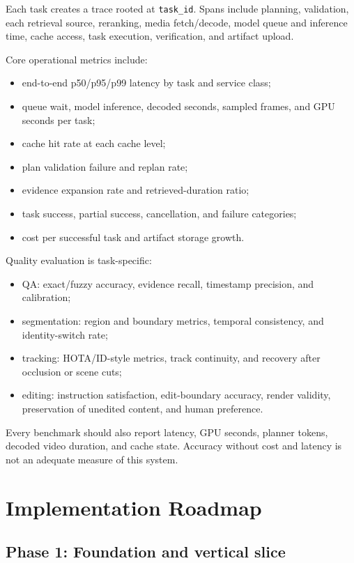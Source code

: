 \documentclass[11pt]{article}
\newcommand{\code}[1]{\texttt{#1}}
\begin{document}
Each task creates a trace rooted at \code{task\_id}. Spans include planning,
validation, each retrieval source, reranking, media fetch/decode, model queue and
inference time, cache access, task execution, verification, and artifact upload.

Core operational metrics include:

\begin{itemize}
  \item end-to-end p50/p95/p99 latency by task and service class;
  \item queue wait, model inference, decoded seconds, sampled frames, and GPU
  seconds per task;
  \item cache hit rate at each cache level;
  \item plan validation failure and replan rate;
  \item evidence expansion rate and retrieved-duration ratio;
  \item task success, partial success, cancellation, and failure categories;
  \item cost per successful task and artifact storage growth.
\end{itemize}

Quality evaluation is task-specific:

\begin{itemize}
  \item QA: exact/fuzzy accuracy, evidence recall, timestamp precision, and
  calibration;
  \item segmentation: region and boundary metrics, temporal consistency, and
  identity-switch rate;
  \item tracking: HOTA/ID-style metrics, track continuity, and recovery after
  occlusion or scene cuts;
  \item editing: instruction satisfaction, edit-boundary accuracy, render
  validity, preservation of unedited content, and human preference.
\end{itemize}

Every benchmark should also report latency, GPU seconds, planner tokens, decoded
video duration, and cache state. Accuracy without cost and latency is not an
adequate measure of this system.

\section{Implementation Roadmap}

\subsection{Phase 1: Foundation and vertical slice}
\end{document}
